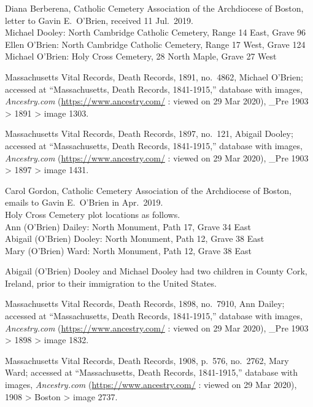 \begin{thebibliography}{99}
	Diana Berberena, Catholic Cemetery Association of the Archdiocese of Boston, letter to Gavin E.\ O'Brien, received 11 Jul.\ 2019.\\
	Michael Dooley: North Cambridge Catholic Cemetery, Range 14 East, Grave 96\\
	Ellen O’Brien: North Cambridge Catholic Cemetery, Range 17 West, Grave 124\\
	Michael O’Brien: Holy Cross Cemetery, 28 North Maple, Grave 27 West
	
	Massachusetts Vital Records, Death Records, 1891, no.\ 4862, Michael O'Brien; accessed at ``Massachusetts, Death Records, 1841-1915,'' database with images, \textit{Ancestry.com} (\url{https://www.ancestry.com/} : viewed on 29 Mar 2020), \_Pre 1903 > 1891 > image 1303.
	
	Massachusetts Vital Records, Death Records, 1897, no.\ 121, Abigail Dooley; accessed at ``Massachusetts, Death Records, 1841-1915,'' database with images, \textit{Ancestry.com} (\url{https://www.ancestry.com/} : viewed on 29 Mar 2020), \_Pre 1903 > 1897 > image 1431.
	
	Carol Gordon, Catholic Cemetery Association of the Archdiocese of Boston, emails to Gavin E.\ O'Brien in Apr.\ 2019.\\
	Holy Cross Cemetery plot locations as follows.\\
	Ann (O’Brien) Dailey: North Monument, Path 17, Grave 34 East\\
	Abigail (O’Brien) Dooley: North Monument, Path 12, Grave 38 East\\
	Mary (O’Brien) Ward: North Monument, Path 12, Grave 38 East
	
	Abigail (O'Brien) Dooley and Michael Dooley had two children in County Cork, Ireland, prior to their immigration to the United States. 
	
	Massachusetts Vital Records, Death Records, 1898, no.\ 7910, Ann Dailey; accessed at ``Massachusetts, Death Records, 1841-1915,'' database with images, \textit{Ancestry.com} (\url{https://www.ancestry.com/} : viewed on 29 Mar 2020), \_Pre 1903 > 1898 > image 1832.
	
	Massachusetts Vital Records, Death Records, 1908, p.\ 576, no.\ 2762, Mary Ward; accessed at ``Massachusetts, Death Records, 1841-1915,'' database with images, \textit{Ancestry.com} (\url{https://www.ancestry.com/} : viewed on 29 Mar 2020), 1908 > Boston > image 2737.
	

\end{thebibliography}
